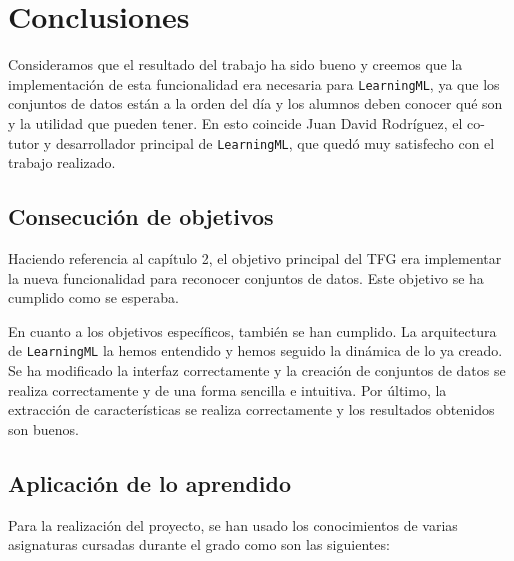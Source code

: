 \documentclass[a4paper, 12pt]{book}
\begin{document}
\cleardoublepage
\chapter{Conclusiones}
\label{chap:conclusiones}

Consideramos que el resultado del trabajo ha sido bueno y creemos que la implementación de esta funcionalidad era necesaria para \texttt{LearningML}, ya que los conjuntos de datos están a la orden del día y los alumnos deben conocer qué son y la utilidad que pueden tener. En esto coincide Juan David Rodríguez, el co-tutor y desarrollador principal de \texttt{LearningML}, que quedó muy satisfecho con el trabajo realizado.


\section{Consecución de objetivos}
\label{sec:consecucion-objetivos}

Haciendo referencia al capítulo 2, el objetivo principal del TFG era implementar la nueva funcionalidad para reconocer conjuntos de datos. Este objetivo se ha cumplido como se esperaba.

En cuanto a los objetivos específicos, también se han cumplido. La arquitectura de \texttt{LearningML} la hemos entendido y hemos seguido la dinámica de lo ya creado. Se ha modificado la interfaz correctamente y la creación de conjuntos de datos se realiza correctamente y de una forma sencilla e intuitiva. Por último, la extracción de características se realiza correctamente y los resultados obtenidos son buenos.

\section{Aplicación de lo aprendido}
\label{sec:aplicacion}

Para la realización del proyecto, se han usado los conocimientos de varias asignaturas cursadas durante el grado como son las siguientes:
\end{document}

